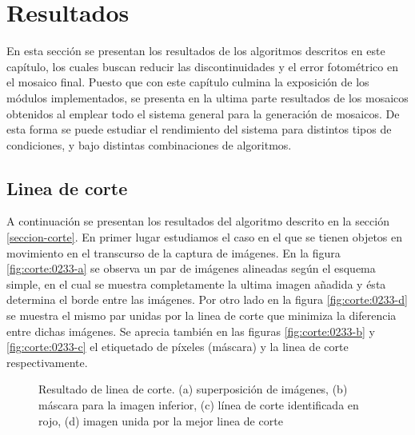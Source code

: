 \section{Resultados}

En esta sección se presentan los resultados de los algoritmos descritos en este capítulo, los cuales buscan reducir las discontinuidades y el error fotométrico en el mosaico final. Puesto que con este capítulo culmina la exposición de los módulos implementados, se presenta en la ultima parte resultados de los mosaicos obtenidos al emplear todo el sistema general para la generación de mosaicos. De esta forma se puede estudiar el rendimiento del sistema para distintos tipos de condiciones, y bajo distintas combinaciones de algoritmos.

\subsection*{Linea de corte}

A continuación se presentan los resultados del algoritmo descrito en la sección \ref{seccion-corte}. En primer lugar estudiamos el caso en el que se tienen objetos en movimiento en el transcurso de la captura de imágenes. En la figura \ref{fig:corte:0233-a} se observa un par de imágenes alineadas según el esquema simple, en el cual se muestra completamente la ultima imagen añadida y ésta determina el borde entre las imágenes. Por otro lado en la figura \ref{fig:corte:0233-d} se muestra el mismo par unidas por la linea de corte que minimiza la diferencia entre dichas imágenes. Se aprecia también en las figuras \ref{fig:corte:0233-b} y \ref{fig:corte:0233-c} el etiquetado de píxeles (máscara) y la linea de corte respectivamente.

\begin{figure}[H]
	\centering     %
	\hspace{0.005\textwidth}%
	

	\caption[Resultado de linea de corte: \textit{Chuspa}]{Resultado de linea de corte. (a) superposición de imágenes, (b) máscara para la imagen inferior, (c) línea de corte identificada en rojo, (d) imagen unida por la mejor linea de corte}
	\label{imagen:cut:0233}
\end{figure}

